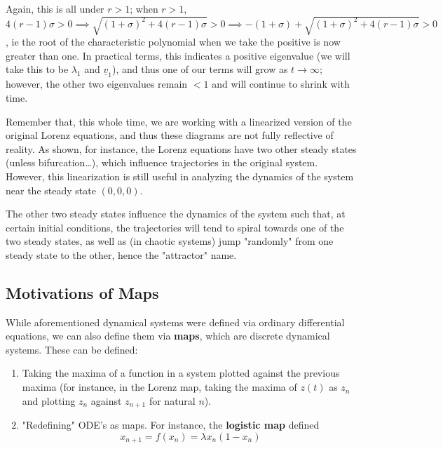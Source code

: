 \documentclass[12pt, oneside]{article}
\begin{document}
Again, this is all under $r > 1$; when $r>1$, $4(r-1)\sigma > 0 \implies \sqrt{(1+\sigma)^2 + 4(r-1)\sigma} >0 \implies -(1+\sigma) + \sqrt{(1+\sigma)^2 + 4(r-1)\sigma} > 0$, ie the root of the characteristic polynomial when we take the positive is now greater than one. In practical terms, this indicates a positive eigenvalue (we will take this to be $\lambda_1$ and $\underline{v}_1$), and thus one of our terms will grow as $t \to \infty$; however, the other two eigenvalues remain $<1$ and will continue to shrink with time.

Remember that, this whole time, we are working with a linearized version of the original Lorenz equations, and thus these diagrams are not fully reflective of reality. As shown, for instance, the Lorenz equations have two other steady states (unless bifurcation\dots), which influence trajectories in the original system. However, this linearization is still useful in analyzing the dynamics of the system near the steady state $(0,0,0)$.

The other two steady states influence the dynamics of the system such that, at certain initial conditions, the trajectories will tend to spiral towards one of the two steady states, as well as (in chaotic systems) jump "randomly" from one steady state to the other, hence the "attractor" name.

\subsection{Motivations of Maps}

While aforementioned dynamical systems were defined via ordinary differential equations, we can also define them via \textbf{maps}, which are discrete dynamical systems. These can be defined:
\begin{enumerate}
  \item Taking the maxima of a function in a system plotted against the previous maxima (for instance, in the Lorenz map, taking the maxima of $z(t)$ as $z_n$ and plotting $z_n$ against $z_{n+1}$ for natural $n$).
  \item "Redefining" ODE's as maps. For instance, the \textbf{logistic map} defined \[x_{n+1} = f(x_n) = \lambda x_n(1-x_n)\]
\end{enumerate}
\end{document}
